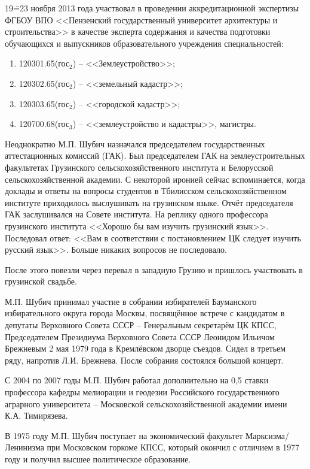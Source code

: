 19\==23 ноября 2013 года участвовал в проведении аккредитационной экспертизы ФГБОУ ВПО <<Пензенский государственный университет архитектуры и строительства>> в качестве эксперта содержания и качества подготовки обучающихся и выпускников образовательного учреждения специальностей:

\begin{enumerate}
	\item 120301.65(гос$_2$) \--- <<Землеустройство>>; 
	\item 120302.65(гос$_2$) \--- <<земельный кадастр>>; 
	\item 120303.65(гос$_2$) \--- <<городской кадастр>>; 
 	\item 120700.68(гос$_3$) \--- <<землеустройство и кадастры>>, магистры.
\end{enumerate}

Неоднократно М.П. Шубич назначался председателем государственных аттестационных комиссий (ГАК). Был председателем ГАК на землеустроительных факультетах Грузинского сельскохозяйственного института и Белорусской сельскохозяйственной академии. С некоторой иронией сейчас вспоминается, когда доклады и ответы на вопросы студентов в Тбилисском сельскохозяйственном институте приходилось выслушивать на грузинском языке. Отчёт председателя ГАК заслушивался на Совете института. На реплику одного профессора грузинского института <<Хорошо бы вам изучить грузинский язык>>. Последовал ответ: <<Вам в соответствии с постановлением ЦК следует изучить русский язык>>. Больше никаких вопросов не последовало.

После этого повезли через перевал в западную Грузию и пришлось участвовать в грузинской свадьбе.

М.П. Шубич принимал участие в собрании избирателей Бауманского избирательного округа города Москвы, посвящённое встрече с кандидатом в депутаты Верховного Совета СССР \--- Генеральным секретарём ЦК КПСС, Председателем Президиума Верховного Совета СССР Леонидом Ильичом Брежневым 2 мая 1979 года в Кремлёвском дворце съездов. Сидел в третьем ряду, напротив Л.И. Брежнева. После собрания состоялся большой концерт. 

С 2004 по 2007 годы М.П. Шубич работал дополнительно на 0,5 ставки профессора кафедры мелиорации и геодезии Российского государственного аграрного университета \--- Московской сельскохозяйственной академии имени К.А. Тимирязева.

В 1975 году М.П. Шубич поступает на экономический факультет Марксизма\-/Ленинизма при Московском горкоме КПСС, который окончил с отличием в 1977 году и получил высшее политическое образование.

